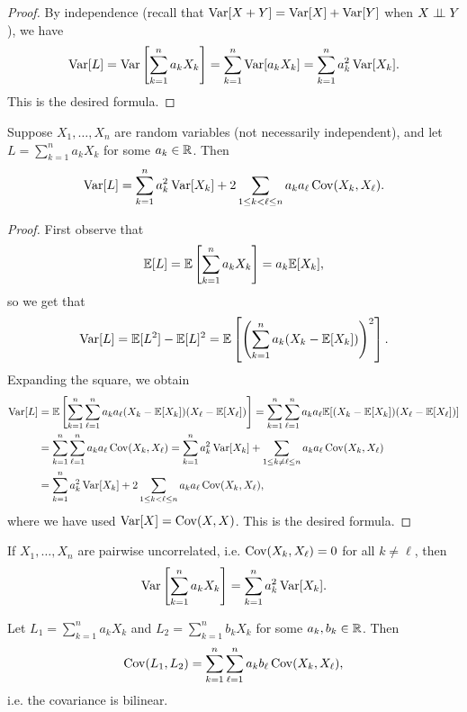\begin{proof}
  By independence (recall that $\operatorname{Var}[X + Y] = \operatorname{Var}[X] + \operatorname{Var}[Y]$ when $X \perp\!\!\!\perp Y$), we have
  \[
    \operatorname{Var}[L] = \operatorname{Var}\left[\sum_{k = 1}^n a_k X_k\right]
    = \sum_{k = 1}^n \operatorname{Var}[a_k X_k]
    = \sum_{k = 1}^n a_k^2 \operatorname{Var}[X_k].
  \]
  This is the desired formula.
\end{proof}

\begin{prop}
  Suppose $X_1, \dots, X_n$ are random variables (not
  necessarily independent), and
  let $L = \sum_{k = 1}^n a_k X_k$ for some $a_k \in \mathbb{R}$.
  Then
  \[
    \operatorname{Var}[L]
    = \sum_{k = 1}^n a_k^2 \operatorname{Var}[X_k] + 2 \sum_{1 \le k < \ell \le n} a_k a_\ell \operatorname{Cov}(X_k, X_\ell).
  \]
\end{prop}

\begin{proof}
  First observe that
  \[
    \mathbb{E}[L] = \mathbb{E}\left[\sum_{k = 1}^n a_k X_k\right]
    = a_k \mathbb{E}[X_k],
  \]
  so we get that
  \[
    \operatorname{Var}[L] = \mathbb{E}[L^2] - \mathbb{E}[L]^2
    = \mathbb{E}\left[\left(\sum_{k = 1}^n a_k (X_k - \mathbb{E}[X_k])\right)^2\right].
  \]
  Expanding the square, we obtain
  \begin{align*}
    \operatorname{Var}[L]
    &= \mathbb{E}\left[\sum_{k = 1}^n \sum_{\ell = 1}^n a_k a_\ell (X_k - \mathbb{E}[X_k])(X_\ell - \mathbb{E}[X_\ell])\right]
    = \sum_{k = 1}^n \sum_{\ell = 1}^n a_k a_\ell \mathbb{E}[(X_k - \mathbb{E}[X_k])(X_\ell - \mathbb{E}[X_\ell])] \\
    &= \sum_{k = 1}^n \sum_{\ell = 1}^n a_k a_\ell \operatorname{Cov}(X_k, X_\ell)
    = \sum_{k = 1}^n a_k^2 \operatorname{Var}[X_k] + \sum_{1 \le k \ne \ell \le n} a_k a_\ell \operatorname{Cov}(X_k, X_\ell) \\
    &= \sum_{k = 1}^n a_k^2 \operatorname{Var}[X_k] + 2 \sum_{1 \le k < \ell \le n} a_k a_\ell \operatorname{Cov}(X_k, X_\ell),
  \end{align*}
  where we have used $\operatorname{Var}[X] = \operatorname{Cov}(X, X)$.
  This is the desired formula.
\end{proof}

\begin{corollary}
  If $X_1, \dots, X_n$ are pairwise
  uncorrelated, i.e.
  $\operatorname{Cov}(X_k, X_\ell) = 0$ for all $k \ne \ell$, then
  \[
    \operatorname{Var}\left[\sum_{k = 1}^n a_k X_k\right]
    = \sum_{k = 1}^n a_k^2 \operatorname{Var}[X_k].
  \]
\end{corollary}

\begin{prop}
  Let $L_1 = \sum_{k = 1}^n a_k X_k$ and
  $L_2 = \sum_{k = 1}^n b_k X_k$ for some $a_k, b_k \in \mathbb{R}$.
  Then
  \[
    \operatorname{Cov}(L_1, L_2) = \sum_{k = 1}^n \sum_{\ell = 1}^n a_k b_\ell \operatorname{Cov}(X_k, X_\ell),
  \]
  i.e. the covariance is bilinear.
\end{prop}

